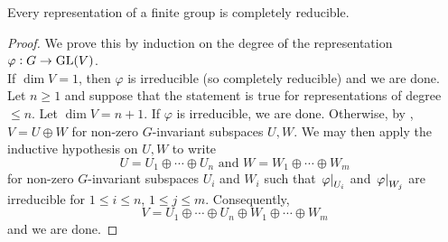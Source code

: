 			\begin{ftheo}
				\label{theo: maschkes theorem}
				Every representation of a finite group is completely reducible.
			\end{ftheo}
			\begin{proof}
				We prove this by induction on the degree of the representation $\varphi : G \to \operatorname{GL}(V)$. \\
				If $\dim V = 1$, then $\varphi$ is irreducible (so completely reducible) and we are done. \\
				Let $n \ge 1$ and suppose that the statement is true for representations of degree $\le n$. Let $\dim V = n+1$. If $\varphi$ is irreducible, we are done. Otherwise, by , $V = U \oplus W$ for non-zero $G$-invariant subspaces $U,W$. We may then apply the inductive hypothesis on $U,W$ to write
				\[ U = U_1 \oplus \cdots \oplus U_n \text{ and } W = W_1 \oplus \cdots \oplus W_m \]
				for non-zero $G$-invariant subspaces $U_i$ and $W_i$ such that $\left.\varphi\right|_{U_i}$ and $\left.\varphi\right|_{W_j}$ are irreducible for $1 \le i \le n$, $1 \le j \le m$. Consequently,
				\[ V = U_1 \oplus \cdots \oplus U_n \oplus W_1 \oplus \cdots \oplus W_m \]
				and we are done.
			\end{proof}

\clearpage